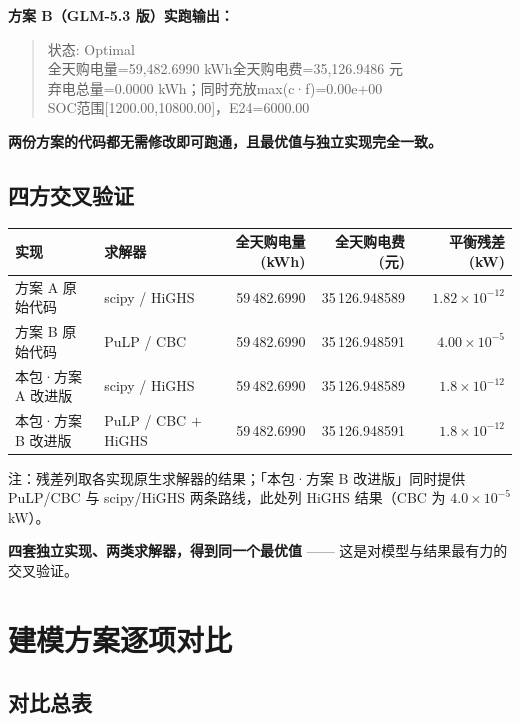 \documentclass[12pt,a4paper]{ctexart}
\begin{document}
\textbf{方案 B（GLM-5.3 版）实跑输出：}

\begin{quote}\ttfamily\small
状态: Optimal\\
全天购电量=59,482.6990 kWh\quad 全天购电费=35,126.9486 元\\
弃电总量=0.0000 kWh；同时充放max(c·f)=0.00e+00\\
SOC范围[1200.00,10800.00]，E24=6000.00
\end{quote}

\textbf{两份方案的代码都无需修改即可跑通，且最优值与独立实现完全一致。}

\subsection{四方交叉验证}

\begin{center}
\footnotesize
\begin{tabular}{@{}p{3.5cm} p{3.2cm} r r r@{}}
\toprule
实现 & 求解器 & 全天购电量 (kWh) & 全天购电费 (元) & 平衡残差 (kW) \\
\midrule
方案 A 原始代码 & scipy / HiGHS & 59\,482.6990 & 35\,126.948589 & $1.82\times10^{-12}$\\
方案 B 原始代码 & PuLP / CBC & 59\,482.6990 & 35\,126.948591 & $4.00\times10^{-5}$\\
本包·方案 A 改进版 & scipy / HiGHS & 59\,482.6990 & 35\,126.948589 & $1.8\times10^{-12}$\\
本包·方案 B 改进版 & PuLP / CBC $+$ HiGHS & 59\,482.6990 & 35\,126.948591 & $1.8\times10^{-12}$\\
\bottomrule
\end{tabular}
\end{center}

\noindent\footnotesize 注：残差列取各实现原生求解器的结果；「本包·方案 B 改进版」同时提供
PuLP/CBC 与 scipy/HiGHS 两条路线，此处列 HiGHS 结果（CBC 为 $4.0\times10^{-5}$ kW）。

\textbf{四套独立实现、两类求解器，得到同一个最优值} —— 这是对模型与结果最有力的交叉验证。

\section{建模方案逐项对比}

\subsection{对比总表}
\end{document}
